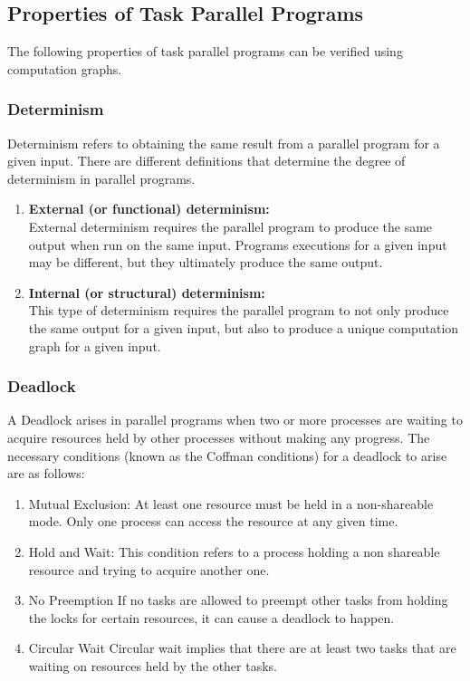\subsection{Properties of Task Parallel Programs}
The following properties of task parallel programs can be verified using computation graphs.
\subsubsection{Determinism}
Determinism refers to obtaining the same result from a parallel program for a given input. There are different definitions that determine the degree of determinism in parallel programs.
\begin{enumerate}
\item
\textbf{External (or functional) determinism:\\}
External determinism requires the parallel program to produce the same output when run on the same input. Programs executions for a given input may be different, but they ultimately produce the same output.
\item
\textbf{Internal (or structural) determinism:\\}
This type of determinism requires the parallel program to not only produce the same output for a given input, but also to produce a unique computation graph for a given input.
\end{enumerate}
\subsubsection{Deadlock}
A Deadlock arises in parallel programs when two or more processes are waiting to acquire resources held by other processes without making any progress. The necessary conditions (known as the Coffman conditions) for a deadlock to arise are as follows:
\begin{enumerate}
\item 
{Mutual Exclusion:} At least one resource must be held in a non-shareable mode. Only one process can access the resource at any given time. 
\item
{Hold and Wait:} This condition refers to a process holding a non shareable resource and trying to acquire another one.
\item
{No Preemption}
If no tasks are allowed to preempt other tasks from holding the locks for certain resources, it can cause a deadlock to happen.
\item
{Circular Wait} Circular wait implies that there are at least two tasks that are waiting on resources held by the other tasks.
\end{enumerate}

